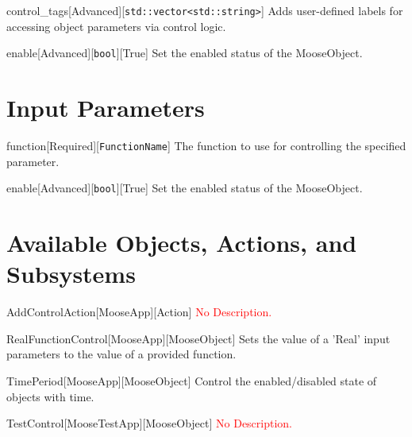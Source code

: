\begin{InputParameter}{control\_tags}[Advanced][\texttt{std::vector{\textless}std::string{\textgreater}}]
Adds user-defined labels for accessing object parameters via control logic.
\end{InputParameter}

\begin{InputParameter}{enable}[Advanced][\texttt{bool}][True]
Set the enabled status of the MooseObject.
\end{InputParameter}

\section{\label{input-parameters}Input Parameters}
\begin{InputParameter}{function}[Required][\texttt{FunctionName}]
The function to use for controlling the specified parameter.
\end{InputParameter}

\begin{InputParameter}{enable}[Advanced][\texttt{bool}][True]
Set the enabled status of the MooseObject.
\end{InputParameter}

\section{\label{available-objects-actions-and-subsystems}Available Objects, Actions, and Subsystems}
\begin{ObjectDescription}{AddControlAction}[MooseApp][Action]
\textcolor{red}{No Description.}
\end{ObjectDescription}

\begin{ObjectDescription}{RealFunctionControl}[MooseApp][MooseObject]
Sets the value of a 'Real' input parameters to the value of a provided function.
\end{ObjectDescription}

\begin{ObjectDescription}{TimePeriod}[MooseApp][MooseObject]
Control the enabled/disabled state of objects with time.
\end{ObjectDescription}

\begin{ObjectDescription}{TestControl}[MooseTestApp][MooseObject]
\textcolor{red}{No Description.}
\end{ObjectDescription}

